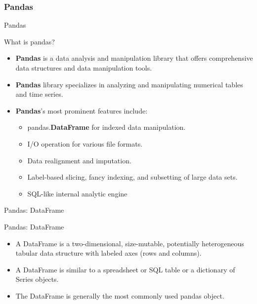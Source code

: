 \documentclass{beamer}
\begin{document}
    \subsubsection{Pandas}
    \begin{frame}[fragile]{Pandas}
        \begin{block}{What is pandas?}
            \begin{itemize}
                \item \textbf{Pandas} is a data analysis and manipulation library that offers comprehensive data structures and data manipulation tools.
                \item \textbf{Pandas} library specializes in analyzing and manipulating numerical tables and time series.
                \item \textbf{Pandas}'s most prominent features include:
                \begin{itemize}
                    \item pandas.\textbf{DataFrame} for indexed data manipulation.
                    \item I/O operation for various file formats.
                    \item Data realignment and imputation.
                    \item Label-based slicing, fancy indexing, and subsetting of large data sets.
                    \item SQL-like internal analytic engine
                \end{itemize}
            \end{itemize}
        \end{block}
    \end{frame}
    \begin{frame}[fragile]{Pandas: DataFrame}
        \begin{block}{Pandas: DataFrame}
            \begin{itemize}
                \item A DataFrame is a two-dimensional, size-mutable, potentially heterogeneous tabular data structure with labeled axes (rows and columns).
                \item A DataFrame is similar to a spreadsheet or SQL table or a dictionary of Series objects.
                \item The DataFrame is generally the most commonly used pandas object.
            \end{itemize}
        \end{block}
    \end{frame}
\end{document}
